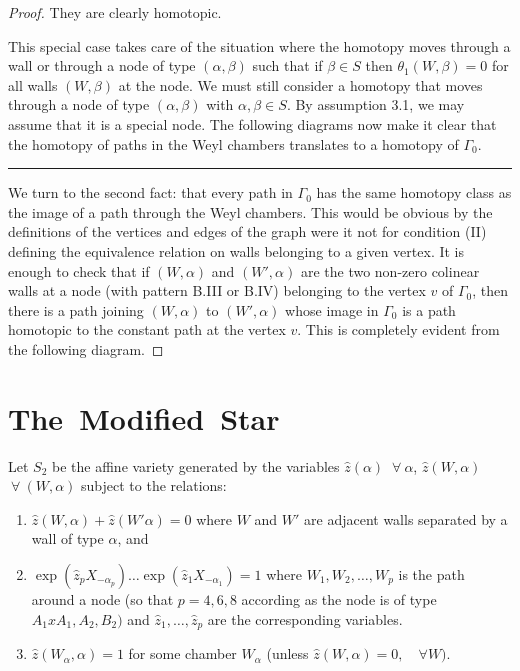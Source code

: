 \documentclass{memo-l}
\theoremstyle{definition}
\theoremstyle{remark}
\numberwithin{section}{chapter}
\numberwithin{equation}{chapter}
\begin{document}
\begin{proof}
\medskip
\medskip


\noindent
They are clearly homotopic.

   This special case takes care of the situation where the homotopy moves
through a wall or through a node of type $({\alpha},{\beta})$ such that if
${\beta}  \in  S$ then ${\theta}_{1}(W,{\beta}) = 0$ for all walls
$(W,{\beta})$ at the node.  We must still consider a homotopy that moves
through a node of type $({\alpha},{\beta})$ with ${\alpha},{\beta}  \in 
S$.  By assumption  3.1, we may assume that it is a special node.  The
following diagrams now make it clear that the homotopy of paths in the Weyl
chambers translates to a homotopy of ${\Gamma}_{0}$. 

\medskip
\medskip
\hrule\medskip
\medskip


We turn to the second fact: that every path in ${\Gamma}_{0}$ has the same
homotopy class as the image of a path through the Weyl chambers.  This
would be obvious by the definitions of the vertices and edges of the graph
were it not for condition (II) defining the equivalence relation on walls
belonging to a given vertex.  It is enough to check that if $(W,{\alpha})$
and $(W',{\alpha})$ are the two non-zero colinear walls at a node (with
pattern B.III or B.IV) belonging to the vertex $v$ of ${\Gamma}_{0}$,
then there is a path joining $(W,{\alpha})$ to $(W',{\alpha})$ whose image
in ${\Gamma}_{0}$ is a path homotopic to the constant path at the vertex
$v$.  This is completely evident from the following diagram.

\medskip
\medskip
\end{proof}

\section{The\ Modified\ Star}

   Let $S_{2}$ be the affine variety generated by the variables $\hat
z({\alpha})$ ${\ \forall\ } {\alpha}$, $\hat z(W,{\alpha})$ ${\ \forall\ }
(W,{\alpha})$ subject to the relations:
\begin{enumerate}[label=\roman*)]
\item $\hat z(W,{\alpha})+\hat z(W'{\alpha}) = 0$ where $W$ and $W'$ are
adjacent walls separated by a wall of type ${\alpha}$, and
\item $\exp(\hat z_{p}X_{-{\alpha}_{p}})\ldots \exp(\hat z_{1}X_{-{\alpha}_{1}}) 
= 1$ where $W_{1},W_{2},\ldots ,W_{p}$ is the path around
a node (so that $p = 4,6,8$ according as the node is of type $A_{1}xA_{1},
A_{2}, B_{2})$ and $\hat z_{1},\ldots ,\hat z_{p}$ are the corresponding
variables.
\item $\hat z(W_{{\alpha}},{\alpha}) = 1$ 
for some chamber $W_\alpha$ (unless $\hat z(W,\alpha)=0,\quad \forall W)$.
\end{enumerate}
\end{document}
